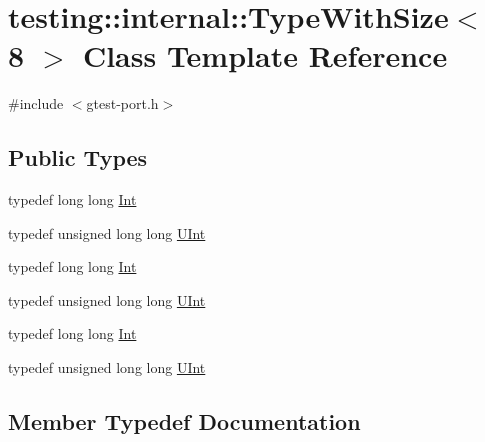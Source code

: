 \hypertarget{classtesting_1_1internal_1_1_type_with_size_3_018_01_4}{}\section{testing\+::internal\+::Type\+With\+Size$<$ 8 $>$ Class Template Reference}
\label{classtesting_1_1internal_1_1_type_with_size_3_018_01_4}


{\ttfamily \#include $<$gtest-\/port.\+h$>$}

\subsection*{Public Types}
\begin{DoxyCompactItemize}
\item 
typedef long long \mbox{\hyperlink{classtesting_1_1internal_1_1_type_with_size_3_018_01_4_a36d5697e5f5254b0495f13c97d747e36}{Int}}
\item 
typedef unsigned long long \mbox{\hyperlink{classtesting_1_1internal_1_1_type_with_size_3_018_01_4_a747e21c5aee8faf07ec65cd4c3d1ca62}{U\+Int}}
\item 
typedef long long \mbox{\hyperlink{classtesting_1_1internal_1_1_type_with_size_3_018_01_4_a36d5697e5f5254b0495f13c97d747e36}{Int}}
\item 
typedef unsigned long long \mbox{\hyperlink{classtesting_1_1internal_1_1_type_with_size_3_018_01_4_a747e21c5aee8faf07ec65cd4c3d1ca62}{U\+Int}}
\item 
typedef long long \mbox{\hyperlink{classtesting_1_1internal_1_1_type_with_size_3_018_01_4_a36d5697e5f5254b0495f13c97d747e36}{Int}}
\item 
typedef unsigned long long \mbox{\hyperlink{classtesting_1_1internal_1_1_type_with_size_3_018_01_4_a747e21c5aee8faf07ec65cd4c3d1ca62}{U\+Int}}
\end{DoxyCompactItemize}


\subsection{Member Typedef Documentation}
\mbox{\label{classtesting_1_1internal_1_1_type_with_size_3_018_01_4_a36d5697e5f5254b0495f13c97d747e36}} 
